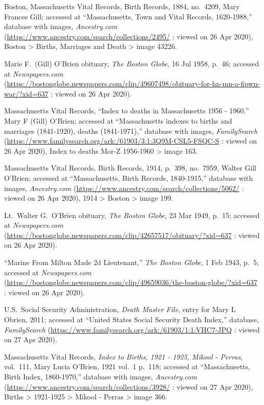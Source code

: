 \begin{thebibliography}{999}
	Boston, Massachusetts Vital Records, Birth Records, 1884, no.\ 4209, Mary Frances Gill; accessed at ``Massachusetts, Town and Vital Records, 1620-1988,'' database with images, \textit{Ancestry.com} (\url{https://www.ancestry.com/search/collections/2495/} : viewed on 26 Apr 2020), Boston > Births, Marriages and Death > image 43226.	
	
	Marie F.\ (Gill) O'Brien obituary, \textit{The Boston Globe}, 16 Jul 1958, p.\ 46; accessed at \textit{Newspapers.com} (\url{https://bostonglobe.newspapers.com/clip/49607498/obituary-for-hn-mn-a-fipwn-war/?xid=637} : viewed on 26 Apr 2020).
	
	Massachusetts Vital Records, ``Index to deaths in Massachusetts 1956 - 1960,'' Mary F (Gill) O'Brien; accessed at ``Massachusetts indexes to births and marriages (1841-1920), deaths (1841-1971),'' database with images, \textit{FamilySearch} (\url{https://www.familysearch.org/ark:/61903/3:1:3Q9M-CSL5-FSQC-S} : viewed on 26 Apr 2020), Index to deaths Mor-Z 1956-1960 > image 163.
	
	Massachusetts Vital Records, Birth Records, 1914, p.\ 398, no.\ 7959, Walter Gill O'Brien; accessed at ``Massachusetts, Birth Records, 1840-1915,'' database with images, \textit{Ancestry.com} (\url{https://www.ancestry.com/search/collections/5062/} : viewed on 26 Apr 2020), 1914 > Boston > image 199.
	
	Lt.\ Walter G.\ O'Brien obituary, \textit{The Boston Globe}, 23 Mar 1949, p.\ 15; accessed at \textit{Newspapers.com} (\url{https://bostonglobe.newspapers.com/clip/42657517/obituary/?xid=637} : viewed on 26 Apr 2020).
	
	``Marine From Milton Made 2d Lieutenant,'' \textit{The Boston Globe}, 1 Feb 1943, p.\ 5; accessed at \textit{Newspapers.com} (\url{https://bostonglobe.newspapers.com/clip/49659036/the-boston-globe/?xid=637} : viewed on 26 Apr 2020).
	
	U.S.\ Social Security Administration, \textit{Death Master File}, entry for Mary L Obrien, 2011; accessed at ``United States Social Security Death Index,'' database, \textit{FamilySearch} (\url{https://www.familysearch.org/ark:/61903/1:1:VHC7-JPQ} : viewed on 27 Apr 2020).
	
	Massachusetts Vital Records, \textit{Index to Births, 1921 - 1925, Mikool - Perras}, vol.\ 111, Mary Lucia O'Brien, 1921 vol.\ 1 p.\ 118; accessed at ``Massachusetts, Birth Index, 1860-1970,'' database with images, \textit{Ancestry.com} (\url{https://www.ancestry.com/search/collections/3928/} : viewed on 27 Apr 2020), Births > 1921-1925 > Mikool - Perras > image 366.
	

\end{thebibliography}

